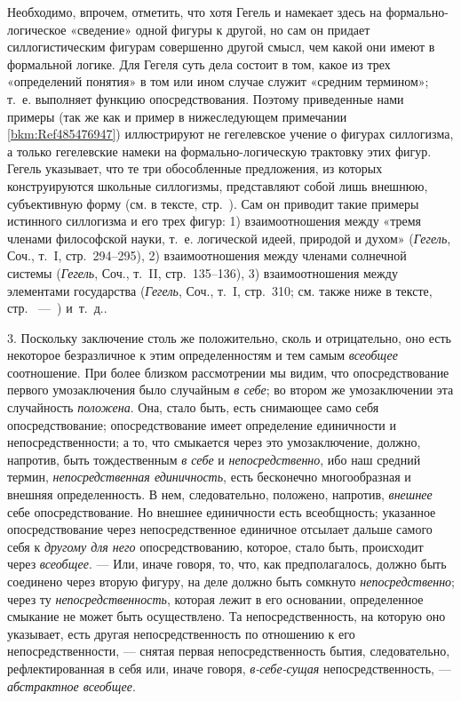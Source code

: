 \documentclass[twoside]{article}
\begin{document}
{{{{{{Необходимо, впрочем, отметить, что хотя Гегель и намекает здесь на 
формально-логическое «сведение» одной фигуры к
другой, но сам он придает силлогистическим фигурам совершенно другой смысл,
чем какой они имеют в формальной логике. Для Гегеля суть дела состоит в
том, какое из трех «определений понятия» в том или ином случае служит
«средним термином»; т.~е. выполняет функцию опосредствования. Поэтому
приведенные нами примеры (так же как и пример в нижеследующем примечании
\ref{bkm:Ref485476947}) иллюстрируют не гегелевское учение о
фигурах силлогизма, а только гегелевские намеки на формально-логическую
трактовку этих фигур. Гегель указывает, что те три обособленные
предложения, из которых конструируются школьные силлогизмы, представляют
собой лишь внешнюю, субъективную форму (см. в тексте,
стр.~\pageref{bkm:bm52a}). Сам он приводит такие примеры
истинного силлогизма и его трех фигур: 1) взаимоотношения между «тремя
членами философской науки, т.~е. логической идеей, природой и духом»
({\em Гегель}, Соч., т.~I, стр.~294–295), 2) взаимоотношения между членами
солнечной системы ({\em Гегель}, Соч., т.~II, стр.~135–136), 
3) взаимоотношения между элементами государства ({\em Гегель},
Соч., т.~I, стр.~310; см. также ниже в тексте, 
стр.~\pageref{bkm:bm52b}} —~\pageref{bkm:bm52c}) и~т.~д.}\label{bkm:bm52}.

3. Поскольку заключение столь же положительно, сколь и
отрицательно, оно есть некоторое безразличное к этим определенностям и тем
самым {\em всеобщее}
соотношение. При более близком рассмотрении мы видим, что
опосредствование первого умозаключения было случайным
{\em в себе}; во втором
же умозаключении эта случайность
{\em положена}. Она,
стало быть, есть снимающее само себя опосредствование; опосредствование
имеет определение единичности и непосредственности; а то, что смыкается
через это умозаключение, должно, напротив, быть тождественным
{\em в себе} и
{\em непосредственно},
ибо наш средний термин,
{\em непосредственная единичность},
есть бесконечно многообразная и внешняя определенность. В
нем, следовательно, положено, напротив,
{\em внешнее} себе
опосредствование. Но внешнее единичности есть всеобщность; указанное
опосредствование через непосредственное единичное отсылает дальше самого
себя к {\em другому для него}
опосредствованию, которое, стало быть, происходит через
{\em всеобщее}. — Или,
иначе говоря, то, что, как предполагалось, должно быть соединено через
вторую фигуру, на деле должно быть сомкнуто
{\em непосредственно};
через ту
{\em непосредственность},
которая лежит в его основании, определенное смыкание не может
быть осуществлено. Та непосредственность, на которую оно указывает, есть
другая непосредственность по отношению к его непосредственности, —
снятая первая непосредственность бытия, следовательно,
рефлектированная в себя или, иначе говоря,
{\em в-себе-сущая}
непосредственность, —
{\em абстрактное всеобщее}.

}}}}
\end{document}
